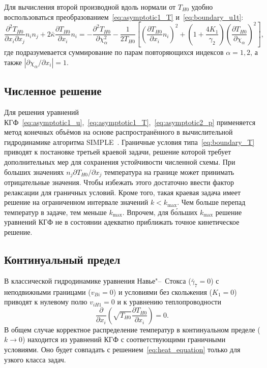 \documentclass[
aps,%
12pt,%
final,%
notitlepage,%
oneside,%
onecolumn,%
nobibnotes,%
nofootinbib,%
superscriptaddress,%
noshowpacs,%
showkeys,%
floatfix,%
tightenlines,%
centertags]%
{revtex4}
\newcommand{\pder}[2][]{\frac{\partial#1}{\partial#2}}
\newcommand{\pderdual}[2][]{\frac{\partial^2#1}{\partial#2^2}}
\newcommand{\pderder}[3][]{\frac{\partial^2#1}{\partial#2\partial#3}}
\newcommand{\Pder}[2][]{\partial#1/\partial#2}
\begin{document}
Для вычисления второй производной вдоль нормали от \(T_{H0}\)
удобно воспользоваться преобразованием~\eqref{eq:asymptotic1_T} и~\eqref{eq:boundary_u1t}:
\begin{equation}\label{eq:Tnn}
    \pderder[T_{H0}]{x_i}{x_j}n_i n_j + 2\bar\kappa\pder[T_{H0}]{x_i}n_i =
    - \pderdual[T_{H0}]{\chi_\alpha} - \frac1{2T_{H0}} \left[
        \left(\pder[T_{H0}]{x_i}n_i\right)^2 +
        \left(1+\frac{4K_1}{\gamma_2}\right) \left(\pder[T_{H0}]{\chi_\alpha}\right)^2
    \right],
\end{equation}
где подразумевается суммирование по парам повторяющихся индексов \(\alpha=1,2\),
а также \(|\Pder[\chi_\alpha]{x_i}| = 1\).

\subsection{Численное решение}

Для решения уравнений КГФ~\eqref{eq:asymptotic1_u},~\eqref{eq:asymptotic1_T},~\eqref{eq:asymptotic2_p}
применяется метод конечных объёмов на основе распространённого в вычислительной гидродинамике алгоритма SIMPLE~\cite{Aoki2007}.
Граничные условия типа~\eqref{eq:boundary_T} приводят к постановке третьей краевой задачи,
решение которой требует дополнительных мер для сохранения устойчивости численной схемы.
При больших значениях \(n_j\Pder[T_{H0}]{x_j}\) температура на границе может принимать отрицательные значения.
Чтобы избежать этого достаточно ввести фактор релаксации для граничных условий.
Кроме того, такая краевая задача имеет решение на ограниченном интервале значений \(k<k_{\max}\).
Чем больше перепад температур в задаче, тем меньше \(k_{\max}\).
Впрочем, для б\'{о}льших \(k_{\max}\) решение уравнений КГФ не в состоянии адекватно приближать
точное кинетическое решение.

\subsection{Континуальный предел}

В классической гидродинамике уравнения Навье"--~Стокса (\(\bar{\gamma}_7=0\))
с неподвижными границами (\(v_{Bi}=0\)) и условиями без скольжения (\(K_1=0\))
приводят к нулевому полю \(v_{iH1}=0\) и к уравнению теплопроводности
\begin{equation}\label{eq:heat_equation}
    \pder{x_i}\left(\sqrt{T_{H0}}\pder[T_{H0}]{x_i}\right) = 0.
\end{equation}
В общем случае корректное распределение температур в континуальном пределе (\(k\to0\))
находится из уравнений КГФ с соответствующими граничными условиями.
Оно будет совпадать с решением~\eqref{eq:heat_equation} только для узкого класса задач.
\end{document}
